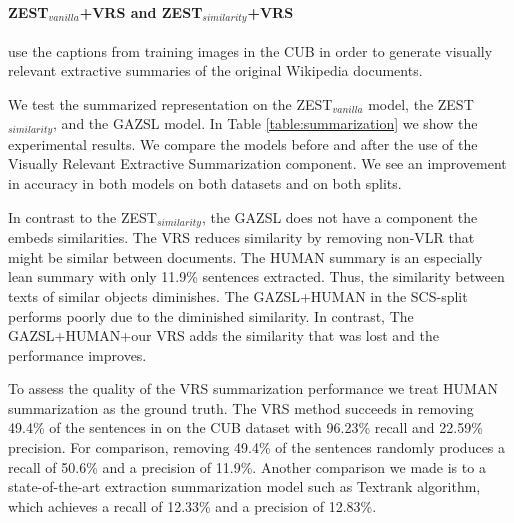 \documentclass[11pt,a4paper]{article}
\newcommand\reut[1]{\textcolor{green}{\textbf{REUT:} #1 }}
\begin{document}
\paragraph{ ZEST$_{vanilla}$+VRS and ZEST$_{similarity}$+VRS }
use the captions from training images in the CUB in order to generate visually relevant extractive summaries of the original Wikipedia documents.

We test the summarized representation on the ZEST$_{vanilla}$ model, the ZEST$_{similarity}$, and the GAZSL \citep{zhu2018generative} model. In Table \ref{table:summarization} we show the experimental results. We compare the models before and after the use of the Visually Relevant Extractive Summarization component. We see an improvement in accuracy in both models on both datasets and on both splits. 

In contrast to the ZEST$_{similarity}$, the GAZSL does not have a component the embeds similarities. The VRS reduces similarity by removing non-VLR that might be similar between documents. 
The HUMAN summary is an especially lean summary with only 11.9\% sentences extracted. Thus, the similarity between texts of similar objects diminishes. The GAZSL+HUMAN in the SCS-split performs poorly due to the diminished similarity. In contrast, The GAZSL+HUMAN+our VRS adds the similarity that was lost and the performance improves.



To assess the quality of the VRS summarization performance we treat HUMAN summarization as the ground truth. The VRS method succeeds in removing 49.4\% of the sentences in on the CUB dataset with 96.23\% recall and 22.59\% precision. For comparison, removing 49.4\% of the sentences randomly produces a recall of 50.6\% and a precision of 11.9\%.
Another comparison we made is to a state-of-the-art extraction summarization model such as Textrank \citep{mihalcea2004textrank} algorithm, which achieves a recall of 12.33\% and a precision of 12.83\%.
\end{document}
